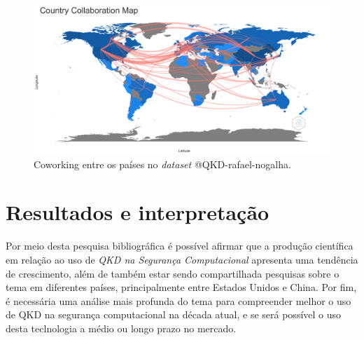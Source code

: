 \begin{figure}[H]
    \centering
    \includegraphics[width=1\textwidth]{experiments/rafaelnogalha/PesquisaBibliografica/QKDSegurancaComputacional/images/country_collaboration_map.png}
    \caption{Coworking entre os países no \textit{dataset} @QKD-rafael-nogalha.}
    \label{fig:cowrking:prod:@QKD-rafael-nogalha}
\end{figure}



\section{Resultados e interpretação}

Por meio desta pesquisa bibliográfica é possível afirmar que a produção científica em relação ao uso de \textit{QKD na Segurança Computacional} apresenta uma tendência de crescimento, além de também estar sendo compartilhada pesquisas sobre o tema em diferentes países, principalmente entre Estados Unidos e China. Por fim, é necessária uma análise mais profunda do tema para compreender melhor o uso de QKD na segurança computacional na década atual, e se será possível o uso desta teclnologia a médio ou longo prazo no mercado.